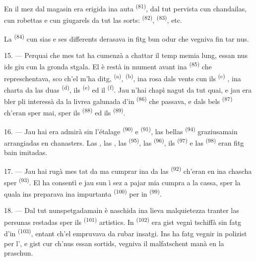 En il mez dal magasin era erigida ina auta  \textsuperscript{(81)},
dal tut pervista cun chandailas, cun robettas e cun giugarels da tut las sorts:
 \textsuperscript{(82)},  \textsuperscript{(83)}, etc.

La  \textsuperscript{(84)} cun sias  e ses
differents  derasava in fitg bun odur che vegniva fin tar nus.

\VUsaut{3.4mm}
\VUsaut{2.8mm}

15. --- Perquai che mes tat ha cumenzà a chattar il temp memia lung, essan nus ids
giu cun la gronda stgala. El è restà in mument avant ina 
\textsuperscript{(85)} che represchentava, sco ch'el m'ha ditg, 
\textsuperscript{(a)},  \textsuperscript{(b)}, ina rosa
dals vents cun ils  \textsuperscript{(c)} , ina charta da las duas  \textsuperscript{(d)}, ils
 \textsuperscript{(e)} ed il  \textsuperscript{(f)}. Jau
n'hai chapì nagut da tut quai, e jau era bler pli interessà da la livrea galunada d'in
 \textsuperscript{(86)} che passava, e dals bels
 \textsuperscript{(87)} ch'eran sper mai, sper ils 
\textsuperscript{(88)} ed ils  \textsuperscript{(89)}.

16. --- Jau hai era admirà sin l'étalage  \textsuperscript{(90)} e
 \textsuperscript{(91)}, las bellas 
\textsuperscript{(94)} graziusamain arrangiadas en chanasters. Las , las
, las  \textsuperscript{(95)}, las
 \textsuperscript{(96)}, ils  \textsuperscript{(97)} e las
 \textsuperscript{(98)} eran fitg bain imitadas.

\VUsaut{4.4mm}
\VUsaut{2.8mm}

17. --- Jau hai rugà mes tat da ma cumprar ina da las 
\textsuperscript{(92)} ch'eran en ina chascha sper 
\textsuperscript{(93)}. El ha consentì e jau sun ì sez a pajar mia cumpra a la cassa,
sper la quala ins preparava ina impurtanta  \textsuperscript{(100)} per in
 \textsuperscript{(99)}.

18. --- Dal tut nunspetgadamain è naschida ina lieva malquietezza tranter las
persunas restadas sper ils  \textsuperscript{(101)} artistics. In
 \textsuperscript{(102)} era gist vegnì tschiffà sin fatg d'in
 \textsuperscript{(103)}, entant ch'el empruvava da rubar insatgi. Ins ha
fatg vegnir in polizist per l', e gist cur ch'nus essan sortids, vegniva
il malfatschent manà en la praschun.

\VUsaut{6.0mm}
\VUfilet{22mm}
